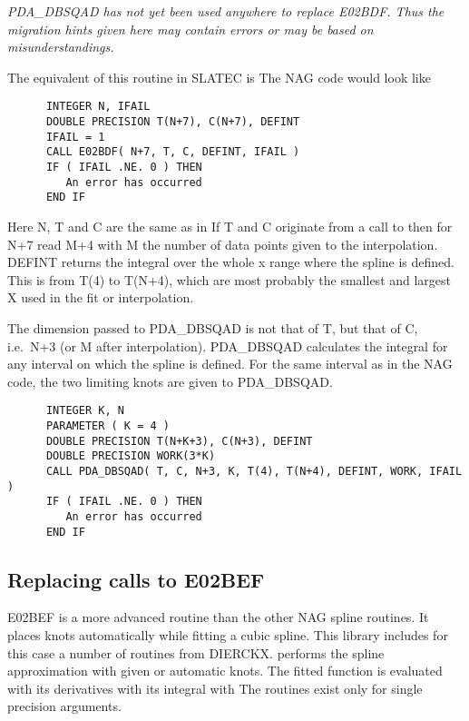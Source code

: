 {\em 
   PDA\_DBSQAD has not yet been used anywhere to replace E02BDF. Thus the
   migration hints given here may contain errors or may be based on
   misunderstandings.
\/}

   The equivalent of this routine in SLATEC is
   The NAG code
   would look like

\begin{verbatim}
      INTEGER N, IFAIL
      DOUBLE PRECISION T(N+7), C(N+7), DEFINT
      IFAIL = 1
      CALL E02BDF( N+7, T, C, DEFINT, IFAIL )
      IF ( IFAIL .NE. 0 ) THEN
         An error has occurred
      END IF
\end{verbatim}

   Here N, T and C are the same as in
   If T and C originate from
   a call to
   then for N+7 read M+4 with M the number of data
   points given to the interpolation. DEFINT returns the integral over
   the whole x range where the spline is defined. This is from T(4) to
   T(N+4), which are most probably the smallest and largest X used in
   the fit or interpolation.

   The dimension passed
   to PDA\_DBSQAD is not that of T, but that of C, i.e.\ N+3 (or M after
   interpolation). PDA\_DBSQAD calculates the integral for any interval
   on which the spline is defined. For the same interval as in the NAG
   code, the two limiting knots are given to PDA\_DBSQAD.

\begin{verbatim}
      INTEGER K, N
      PARAMETER ( K = 4 )
      DOUBLE PRECISION T(N+K+3), C(N+3), DEFINT
      DOUBLE PRECISION WORK(3*K)
      CALL PDA_DBSQAD( T, C, N+3, K, T(4), T(N+4), DEFINT, WORK, IFAIL )
      IF ( IFAIL .NE. 0 ) THEN
         An error has occurred
      END IF
\end{verbatim}


\subsection{Replacing calls to E02BEF}

   E02BEF is a more advanced routine than the other NAG spline routines.
   It places knots automatically while fitting a cubic spline. This
   library includes for this case a number of routines from DIERCKX.
   performs the spline approximation with given or
   automatic knots. The fitted function is evaluated with
   its
   derivatives with
   its integral with
   The routines exist
   only for single precision arguments.

